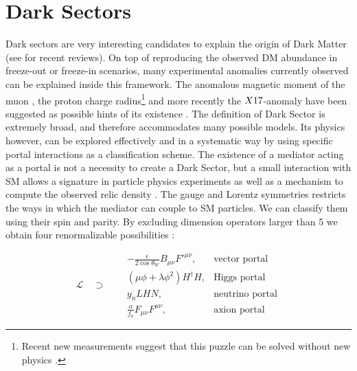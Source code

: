 \section{Dark Sectors}
\label{ch1:sec:dm-sector}

Dark sectors are very interesting candidates to explain the origin of Dark Matter (see \cite{battaglieri2017cosmic,alex2016dark} for recent reviews). On top of reproducing the observed DM abundance in freeze-out or freeze-in scenarios, many experimental anomalies currently observed can be explained inside this framework. The anomalous magnetic moment of the muon \cite{blum2013muon}, the proton charge radius\footnote{Recent new measurements suggest that this puzzle can be solved without new physics \cite{Karshenboim2019}.} \cite{Pohl2010} and more recently the $X17$-anomaly \cite{Krasznahorkay:2015iga,Krasznahorkay:2019lyl} have been suggested as possible hints of its existence \cite{alex2016dark}. The definition of Dark Sector is extremely broad, and therefore accommodates many possible models. Its physics however, can be explored effectively and in a systematic way by using specific portal interactions as a classification scheme.  The existence of a mediator acting as a portal is not a necessity to create a Dark Sector, but a small interaction with SM allows a signature in particle physics experiments as well as a mechanism to compute the observed relic density \cite{prw, pospelov}. The gauge and Lorentz symmetries restricts the ways in which the mediator can couple to SM particles. We can classify them using their spin and parity. By excluding dimension operators larger than 5 we obtain four renormalizable possibilities \cite{alex2016dark}:

\begin{equation}
  \label{eq:dm-portals}
  \mathcal{L} \quad \supset \quad
\begin{aligned}
  &-\frac{\epsilon}{2 \cos{\theta_W}}B_{\mu \nu}F'^{\mu \nu}, &\textrm{vector portal}\\
  & (\mu \phi + \lambda \phi^2)H^{\dagger}H, &\textrm{Higgs portal}\\
  &y_n LHN, &\textrm{neutrino portal} \\
  &\frac{a}{f_a} F_{\mu \nu} F^{\mu \nu}, &\textrm{axion portal}
\end{aligned}
\end{equation}


